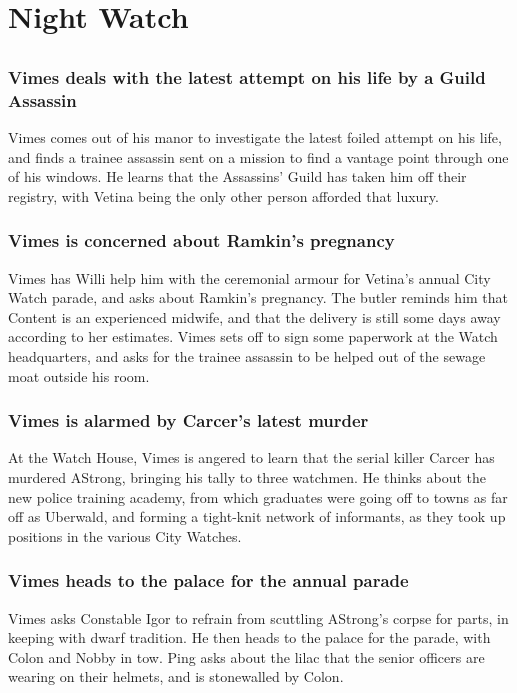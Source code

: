\section{Night Watch}


\subsection{}
\subsubsection{\Gls{Vimes} deals with the latest attempt on his life by a Guild Assassin}
\Gls{Vimes} comes out of his manor to investigate the latest foiled attempt on his life, and finds
a trainee assassin sent on a mission to find a vantage point through one of his windows. He learns
that the Assassins' Guild has taken him off their registry, with \Gls{Vetina} being the only other
person afforded that luxury.

\subsubsection{\Gls{Vimes} is concerned about \Gls{Ramkin}'s pregnancy}
\Gls{Vimes} has \Gls{Willi} help him with the ceremonial armour for \Gls{Vetina}'s annual City
Watch parade, and asks about \Gls{Ramkin}'s pregnancy. The butler reminds him that \Gls{Content} is
an experienced midwife, and that the delivery is still some days away according to her estimates.
\Gls{Vimes} sets off to sign some paperwork at the Watch headquarters, and asks for the trainee
assassin to be helped out of the sewage moat outside his room.

\subsubsection{\Gls{Vimes} is alarmed by \Gls{Carcer}'s latest murder}
At the Watch House, \Gls{Vimes} is angered to learn that the serial killer \Gls{Carcer} has
murdered \Gls{AStrong}, bringing his tally to three watchmen. He thinks about the new police
training academy, from which graduates were going off to towns as far off as Uberwald, and forming
a tight-knit network of informants, as they took up positions in the various City Watches.

\subsubsection{\Gls{Vimes} heads to the palace for the annual parade}
\Gls{Vimes} asks Constable \Gls{Igor} to refrain from scuttling \Gls{AStrong}'s corpse for parts,
in keeping with dwarf tradition. He then heads to the palace for the parade, with \Gls{Colon} and
\Gls{Nobby} in tow. \Gls{Ping} asks about the lilac that the senior officers are wearing on their
helmets, and is stonewalled by \Gls{Colon}.

